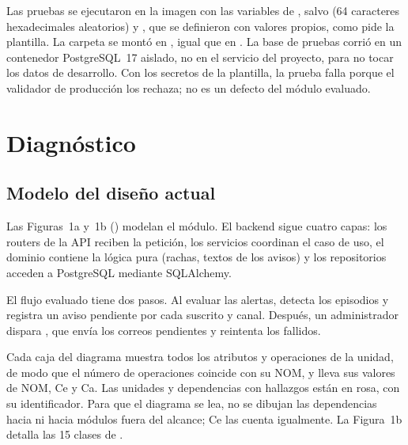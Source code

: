 \documentclass[11pt,a4paper]{article}
\begin{document}
 Las pruebas se ejecutaron en la imagen  con las variables  de , salvo  (64 caracteres hexadecimales aleatorios) y , que se definieron con valores propios, como pide la plantilla. La carpeta  se montó en , igual que en . La base de pruebas corrió en un contenedor PostgreSQL~17 aislado, no en el servicio  del proyecto, para no tocar los datos de desarrollo. Con los secretos de la plantilla, la prueba  falla porque el validador de producción los rechaza; no es un defecto del módulo evaluado.

\section{Diagnóstico}

\subsection{Modelo del diseño actual}

Las Figuras~1a y~1b () modelan el módulo. El backend sigue cuatro capas: los routers de la API reciben la petición, los servicios coordinan el caso de uso, el dominio contiene la lógica pura (rachas, textos de los avisos) y los repositorios acceden a PostgreSQL mediante SQLAlchemy.

El flujo evaluado tiene dos pasos. Al evaluar las alertas,  detecta los episodios y  registra un aviso pendiente por cada suscrito y canal. Después, un administrador dispara , que envía los correos pendientes y reintenta los fallidos.

Cada caja del diagrama muestra todos los atributos y operaciones de la unidad, de modo que el número de operaciones coincide con su NOM, y lleva sus valores de NOM, Ce y Ca. Las unidades y dependencias con hallazgos están en rosa, con su identificador. Para que el diagrama se lea, no se dibujan las dependencias hacia  ni hacia módulos fuera del alcance; Ce las cuenta igualmente. La Figura~1b detalla las 15 clases de .

\end{document}
